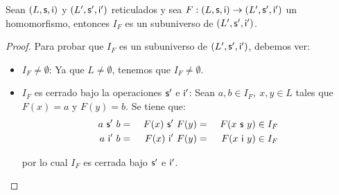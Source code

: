   \begin{lemma} \label{lemma_6}
    \PN Sean $(L, \mathsf{s}, \mathsf{i})$ y $(L^{\prime}, \mathsf{s}^{\prime}, \mathsf{i}^{\prime})$ reticulados y sea $F: (L, \mathsf{s}, \mathsf{i}) \rightarrow (L^{\prime}, \mathsf{s}^{\prime}, \mathsf{i}^{\prime})$ un homomorfismo, entonces $I_{F}$ es
    un subuniverso de $(L^{\prime}, \mathsf{s}^{\prime}, \mathsf{i}^{\prime})$.
  \end{lemma}
  \begin{proof}
    \PN Para probar que $I_{F}$ es un subuniverso de $(L^{\prime}, \mathsf{s}^{\prime}, \mathsf{i}^{\prime})$, debemos ver:
    \begin{itemize}
      \item $I_{F} \neq \emptyset$: Ya que $L \neq \emptyset$, tenemos que $I_{F} \neq \emptyset$.
      \item $I_{F}$ es cerrado bajo la operaciones $\mathsf{s}^{\prime}$ e $\mathsf{i}^{\prime}$: Sean $a, b \in I_{F}, \ x, y \in L$
      tales que $F(x) = a$ y $F(y) = b$. Se tiene que:
      \begin{alignat*}{3}
        a \ \mathsf{s}^{\prime} \ b &=& \ F(x) \ \mathsf{s}^{\prime} \ F(y) &=& \ F(x \ \mathsf{s} \ y) \in I_{F} \\
        a \ \mathsf{i}^{\prime} \ b &=& \ F(x) \ \mathsf{i}^{\prime} \ F(y) &=& \ F(x \ \mathsf{i} \ y) \in I_{F}
      \end{alignat*}

      \PN por lo cual $I_{F}$ es cerrada bajo $\mathsf{s}^{\prime}$ e $\mathsf{i}^{\prime}$.
    \end{itemize}
  \end{proof}


